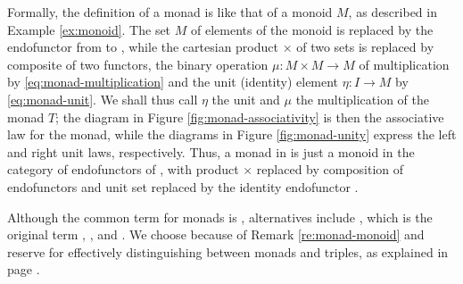 \begin{remark}
  \label{re:monad-monoid}
  Formally, the definition of a monad is like that of a monoid $M$, as
  described in Example \ref{ex:monoid}. The set $M$ of
  elements of the monoid is replaced by the endofunctor  from
   to , while the cartesian product $\times$ of two sets
  is replaced by composite of two functors, the binary operation $\mu:
  M \times M \to M$ of multiplication by
  \eqref{eq:monad-multiplication} and the unit (identity) element
  $\eta: I \to M$ by \eqref{eq:monad-unit}. We shall thus call $\eta$
  the unit and $\mu$ the multiplication of the monad $T$; the diagram
  in Figure \ref{fig:monad-associativity} is then the associative law
  for the monad, while the diagrams in Figure \ref{fig:monad-unity}
  express the left and right unit laws, respectively. Thus, a monad in
   is just a monoid in the category of endofunctors of ,
  with product $\times$ replaced by composition of endofunctors and
  unit set replaced by the identity endofunctor
  \parencite[138]{maclane-1998}.
\end{remark}



\begin{terminology}
  \label{ter:monad}
  Although the common term for monads is , alternatives
  include , which is the original term
  \parencite[30]{manes-1976}, 
  \parencite[29]{manes-1976}, and 
  \parencites[83]{barr-2005}[372]{barr-wells-2012}.
  We choose  because of Remark
  \ref{re:monad-monoid} and reserve  for effectively
  distinguishing between monads and triples, as explained in page
  \pageref{ter:triple}.
\end{terminology}


